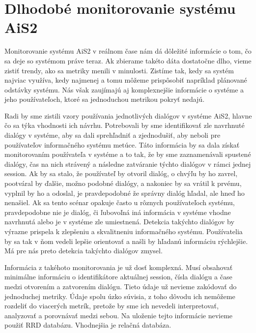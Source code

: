 \documentclass[a4paper, upjsfrontpage, thesismargins, thesislinespacing]{rnthesis}
\begin{document}
\section{Dlhodobé monitorovanie systému AiS2}

Monitorovanie systému AiS2 v reálnom čase nám dá dôležité informácie o tom, čo sa deje so systémom práve teraz.
Ak zbierame takéto dáta dostatočne dlho, vieme zistiť trendy, ako sa metriky menili v minulosti.
Zistíme tak, kedy sa systém najviac využíva, kedy najmenej a tomu môžeme prispôsobiť napríklad plánované odstávky systému.
Nás však zaujímajú aj komplexnejšie informácie o systéme a jeho používateľoch, ktoré sa jednoduchou metrikou pokryť nedajú.

Radi by sme zistili vzory používania jednotlivých dialógov v systéme AiS2, hlavne čo sa týka vhodnosti ich návrhu.
Potrebovali by sme identifikovať zle navrhnuté dialógy v systéme, aby sa dali sprehľadniť a zjednodušiť, aby neboli pre používateľov informačného systému metúce.
Táto informácia by sa dala získať monitorovaním používateľa v systéme a to tak, že by sme zaznamenávali spustené dialógy, čas na nich strávený a následne zatváranie týchto dialógov v rámci jednej session.
Ak by sa stalo, že používateľ by otvoril dialóg, o chvýľu by ho zavrel, pootváral by ďalšie, možno podobné dialógy, a nakoniec by sa vrátil k prvému, vyplnil by ho a odoslal, je pravdepodobné že správny dialóg hľadal, ale hneď ho nenašiel.
Ak sa tento scénar opakuje často u rôznych používateľoch systému, pravdepodobne nie je dialóg, či ľubovoľná iná informácia v systéme vhodne navrhnutá alebo je v systéme zle umiestnená.
Detekcia takýchto dialógov by výrazne prispela k zlepšeniu a skvalitneniu informačného systému.
Používatelia by sa tak v ňom vedeli lepšie orientovať a našli by hľadanú informáciu rýchlejšie.
Má pre nás preto detekcia takýchto dialógov zmysel.

Informácia z takéhoto monitorovania je už dosť komplexná.
Musí obsahovať minimálne informáciu o identifikátore aktuálnej session, čísla dialógu a čase medzi otvorením a zatvorením dialógu.
Tieto údaje už nevieme zakódovať do jednoduchej metriky.
Údaje spolu úzko súvisia, z toho dôvodu ich nemôžeme rozdeliť do viacerých metrík, 
	pretože by sme ich nevedeli interpretovať, analyzovať a porovnávať medzi sebou.
Na uloženie tejto informácie nevieme použiť RRD databázu.
Vhodnejšia je relačná databáza.
\end{document}

